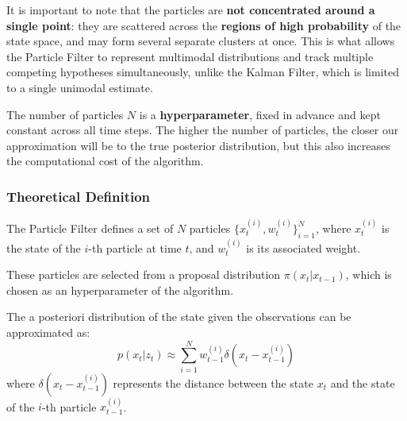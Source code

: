 It is important to note that the particles are \textbf{not concentrated around a single point}: they are scattered across the \textbf{regions of high probability} of the state space, and may form several separate clusters at once.
This is what allows the Particle Filter to represent multimodal distributions and track multiple competing hypotheses simultaneously, unlike the Kalman Filter, which is limited to a single unimodal estimate.

The number of particles $N$ is a \textbf{hyperparameter}, fixed in advance and kept constant across all time steps.
The higher the number of particles, the closer our approximation will be to the true posterior distribution, but this also increases the computational cost of the algorithm.

\subsubsection{Theoretical Definition}
The Particle Filter defines a set of $N$ particles 
$\{x_t^{(i)}, w_t^{(i)}\}_{i=1}^N$, where $x_t^{(i)}$ is the state of the $i$-th particle at time $t$, 
and $w_t^{(i)}$ is its associated weight.

These particles are selected from a proposal distribution $\pi(x_t | x_{t-1})$, 
which is chosen as an hyperparameter of the algorithm.

The a posteriori distribution of the state given the observations can be approximated as:
$$p(x_t | z_{t}) \approx \sum_{i=1}^N w_{t-1}^{(i)} \delta(x_t - x_{t-1}^{(i)})$$
where $\delta(x_t - x_{t-1}^{(i)})$ represents the distance between the state $x_t$ and the state of the $i$-th particle $x_{t-1}^{(i)}$.

